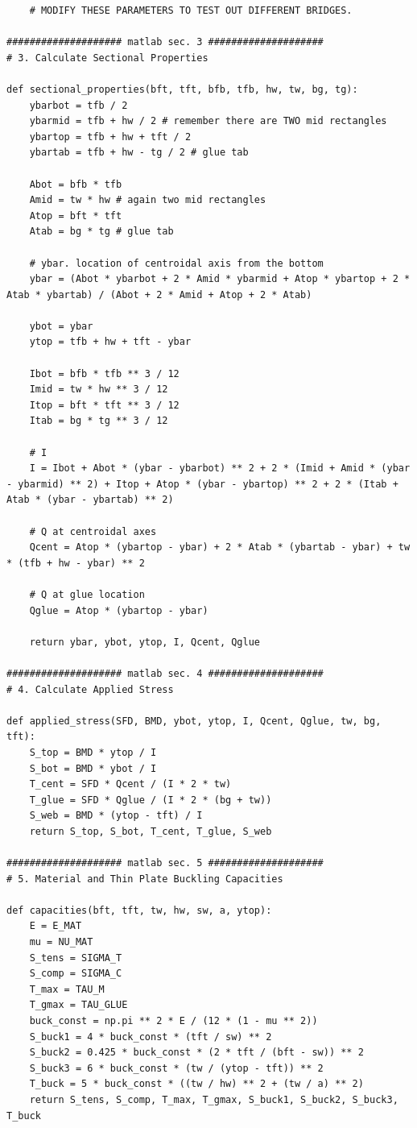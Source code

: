 \begin{verbatim}
    # MODIFY THESE PARAMETERS TO TEST OUT DIFFERENT BRIDGES.

#################### matlab sec. 3 ####################
# 3. Calculate Sectional Properties

def sectional_properties(bft, tft, bfb, tfb, hw, tw, bg, tg):
    ybarbot = tfb / 2
    ybarmid = tfb + hw / 2 # remember there are TWO mid rectangles
    ybartop = tfb + hw + tft / 2
    ybartab = tfb + hw - tg / 2 # glue tab

    Abot = bfb * tfb
    Amid = tw * hw # again two mid rectangles
    Atop = bft * tft
    Atab = bg * tg # glue tab

    # ybar. location of centroidal axis from the bottom
    ybar = (Abot * ybarbot + 2 * Amid * ybarmid + Atop * ybartop + 2 * Atab * ybartab) / (Abot + 2 * Amid + Atop + 2 * Atab)

    ybot = ybar
    ytop = tfb + hw + tft - ybar

    Ibot = bfb * tfb ** 3 / 12
    Imid = tw * hw ** 3 / 12
    Itop = bft * tft ** 3 / 12
    Itab = bg * tg ** 3 / 12

    # I
    I = Ibot + Abot * (ybar - ybarbot) ** 2 + 2 * (Imid + Amid * (ybar - ybarmid) ** 2) + Itop + Atop * (ybar - ybartop) ** 2 + 2 * (Itab + Atab * (ybar - ybartab) ** 2)

    # Q at centroidal axes
    Qcent = Atop * (ybartop - ybar) + 2 * Atab * (ybartab - ybar) + tw * (tfb + hw - ybar) ** 2

    # Q at glue location
    Qglue = Atop * (ybartop - ybar)

    return ybar, ybot, ytop, I, Qcent, Qglue

#################### matlab sec. 4 ####################
# 4. Calculate Applied Stress

def applied_stress(SFD, BMD, ybot, ytop, I, Qcent, Qglue, tw, bg, tft):
    S_top = BMD * ytop / I
    S_bot = BMD * ybot / I
    T_cent = SFD * Qcent / (I * 2 * tw)
    T_glue = SFD * Qglue / (I * 2 * (bg + tw))
    S_web = BMD * (ytop - tft) / I
    return S_top, S_bot, T_cent, T_glue, S_web

#################### matlab sec. 5 ####################
# 5. Material and Thin Plate Buckling Capacities

def capacities(bft, tft, tw, hw, sw, a, ytop):
    E = E_MAT
    mu = NU_MAT
    S_tens = SIGMA_T
    S_comp = SIGMA_C
    T_max = TAU_M
    T_gmax = TAU_GLUE
    buck_const = np.pi ** 2 * E / (12 * (1 - mu ** 2))
    S_buck1 = 4 * buck_const * (tft / sw) ** 2
    S_buck2 = 0.425 * buck_const * (2 * tft / (bft - sw)) ** 2
    S_buck3 = 6 * buck_const * (tw / (ytop - tft)) ** 2
    T_buck = 5 * buck_const * ((tw / hw) ** 2 + (tw / a) ** 2)
    return S_tens, S_comp, T_max, T_gmax, S_buck1, S_buck2, S_buck3, T_buck


\end{verbatim}
